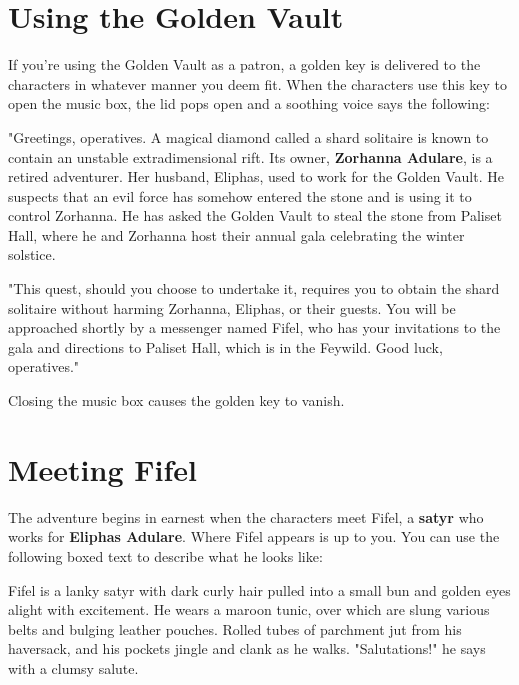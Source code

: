 \documentclass[10pt,a4paper,twoside,bg=print,twocolumn,openany,nodeprecatedcode]{dndbook}
\begin{document}
\section{Using the Golden Vault}
If you're using the Golden Vault as a patron, a golden key is delivered to the characters in whatever manner you deem fit. When the characters use this key to open the music box, the lid pops open and a soothing voice says the following:

\begin{DndReadAloud}{}
"Greetings, operatives. A magical diamond called a shard solitaire is known to contain an unstable extradimensional rift. Its owner, \textbf{Zorhanna Adulare}, is a retired adventurer. Her husband, Eliphas, used to work for the Golden Vault. He suspects that an evil force has somehow entered the stone and is using it to control Zorhanna. He has asked the Golden Vault to steal the stone from Paliset Hall, where he and Zorhanna host their annual gala celebrating the winter solstice.

"This quest, should you choose to undertake it, requires you to obtain the shard solitaire without harming Zorhanna, Eliphas, or their guests. You will be approached shortly by a messenger named Fifel, who has your invitations to the gala and directions to Paliset Hall, which is in the Feywild. Good luck, operatives."

\end{DndReadAloud}

Closing the music box causes the golden key to vanish.

\section{Meeting Fifel}
The adventure begins in earnest when the characters meet Fifel, a \textbf{satyr} who works for \textbf{Eliphas Adulare}. Where Fifel appears is up to you. You can use the following boxed text to describe what he looks like:

\begin{DndReadAloud}{}
Fifel is a lanky satyr with dark curly hair pulled into a small bun and golden eyes alight with excitement. He wears a maroon tunic, over which are slung various belts and bulging leather pouches. Rolled tubes of parchment jut from his haversack, and his pockets jingle and clank as he walks. "Salutations!" he says with a clumsy salute.

\end{DndReadAloud}
\end{document}
